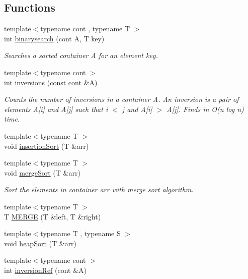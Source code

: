 \subsection*{Functions}
\begin{DoxyCompactItemize}
\item 
{\footnotesize template$<$typename cont , typename T $>$ }\\int \hyperlink{namespace_alg_lib_a42bfc6dd0232e3e7d0a460a5bb74059a}{binarysearch} (cont A, T key)
\begin{DoxyCompactList}\small\item\em Searches a sorted container A for an element key. \end{DoxyCompactList}\item 
{\footnotesize template$<$typename cont $>$ }\\int \hyperlink{namespace_alg_lib_a97a13becf845332c126803e014b03286}{inversions} (const cont \&A)
\begin{DoxyCompactList}\small\item\em Counts the number of inversions in a container A. An inversion is a pair of elements A\mbox{[}i\mbox{]} and A\mbox{[}j\mbox{]} such that i $<$ j and A\mbox{[}i\mbox{]} $>$ A\mbox{[}j\mbox{]}. Finds in O(n log n) time. \end{DoxyCompactList}\item 
{\footnotesize template$<$typename T $>$ }\\void \hyperlink{namespace_alg_lib_a285a3cda7220504508dbb7d0df3dba21}{insertion\+Sort} (T \&arr)
\item 
{\footnotesize template$<$typename T $>$ }\\void \hyperlink{namespace_alg_lib_a50103bb855668c829f3d0def288521a8}{merge\+Sort} (T \&arr)
\begin{DoxyCompactList}\small\item\em Sort the elements in container arr with merge sort algorithm. \end{DoxyCompactList}\item 
{\footnotesize template$<$typename T $>$ }\\T \hyperlink{namespace_alg_lib_a964728cae397746308b2d688e6f85d01}{M\+E\+R\+GE} (T \&left, T \&right)
\item 
{\footnotesize template$<$typename T , typename S $>$ }\\void \hyperlink{namespace_alg_lib_a09ea4c537af6d2dcc36a9753b7af7c05}{heap\+Sort} (T \&arr)
\item 
{\footnotesize template$<$typename cont $>$ }\\int \hyperlink{namespace_alg_lib_ab90b28703ab96313011a0fc73af136e0}{inversion\+Ref} (cont \&A)

\end{DoxyCompactItemize}
